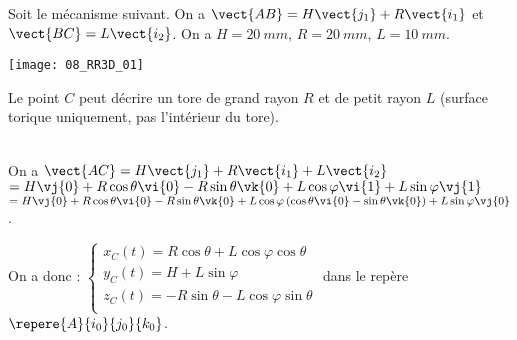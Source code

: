 \normalfalse \difficiletrue \tdifficilefalse
\correctiontrue


\setcounter{question}{0}
\ifcorrection
\else
{}
\fi

\ifprof
\else
Soit le mécanisme suivant. On a $\vect{AB}=H\vect{j_1}+R\vect{i_1}$ et $\vect{BC}=L\vect{i_2}$. On a $H=\SI{20}{mm}$, $R=\SI{20}{mm}$, $L=\SI{10}{mm}$. 
\begin{center}
\texttt{[image: 08\_RR3D\_01]}
\end{center}
\fi


\ifprof
\else
{}
\fi
\ifprof
Le point $C$ peut décrire un tore de grand rayon $R$ et de petit rayon $L$ (surface torique uniquement, pas l'intérieur du tore). 
\else
\fi

\ifprof ~\\
On  a  $\vect{AC}=H\vect{j_1}+R\vect{i_1}+L\vect{i_2}$ $=H\vj{0}+R\cos\theta\vi{0}-R\sin\theta\vk{0}+L\cos\varphi\vi{1}+L\sin\varphi\vj{1}$ 
$=H\vj{0}+R\cos\theta\vi{0}-R\sin\theta\vk{0}+L\cos\varphi\left(\cos\theta\vi{0}-\sin\theta\vk{0} \right)+L\sin\varphi\vj{0}$ .

On a donc :
$\left\{
\begin{array}{l}
x_C(t)=R\cos\theta+L\cos\varphi\cos\theta \\
y_C(t)= H+L\sin\varphi\\
z_C(t)=  -R\sin\theta-L\cos\varphi\sin\theta\\
\end{array}
\right.
$ dans le repère $\repere{A}{i_0}{j_0}{k_0}$.
\else
\fi
